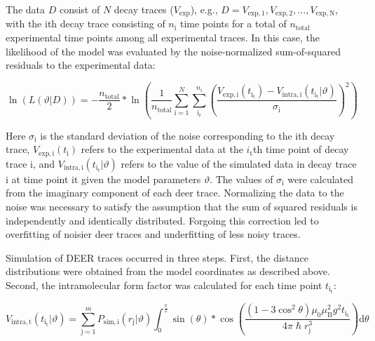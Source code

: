 The data $D$ consist of $N$ decay traces ($V_{\mathup{exp}}$), e.g., $D = {V_{\mathup{exp,1}}, V_{\mathup{exp,2}},…, V_{\mathup{exp,N}}}$, with the $\mathup{i}$th decay trace consisting of $n_{\mathup{i}}$ time points for a total of $n_{\mathup{total}}$ experimental time points among all experimental traces. In this case, the likelihood of the model was evaluated by the noise-normalized sum-of-squared residuals to the experimental data:

\begin{equation}
    \ln \left( L \left( \vartheta | D \right) \right)=-\frac{ n_{\mathup{total}}}{2} * \ln \left( \frac{1} {n_{\mathup{total}}} \sum_{\mathup{i}=1}^{N} \sum_{\mathup{i}_{t}}^{n_{\mathup{i}}} \left( \frac{ V_{\mathup{exp,i}} \left( t_{\mathup{i_t}} \right) - V_{\mathup{intra,i}} \left( t_{\mathup{i_{t}}} | \vartheta \right) }{\sigma_{\mathup{i}}} \right)^2 \right)
    \label{eq:multilateration_loglikelihood}
\end{equation}

Here $\sigma_{\mathup{i}}$ is the standard deviation of the noise corresponding to the $\mathup{i}$th decay trace, $V_{\mathup{exp,i}}\left(t_{\mathup{i}} \right)$ refers to the experimental data at the $i_{\mathup{t}}$th time point of decay trace $\mathup{i}$, and $V_{\mathup{intra,i}}\left( t_{\mathup{i}_{t}}|\vartheta \right)$ refers to the value of the simulated data in decay trace $\mathup{i}$ at time point it given the model parameters $\vartheta$. The values of $\sigma_{\mathup{i}}$ were calculated from the imaginary component of each \gls{deer} trace. Normalizing the data to the noise was necessary to satisfy the assumption that the sum of squared residuals is independently and identically distributed. Forgoing this correction led to overfitting of noisier \gls{deer} traces and underfitting of less noisy traces.

Simulation of DEER traces occurred in three steps. First, the distance distributions were obtained from the model coordinates as described above. Second, the intramolecular form factor was calculated for each time point $t_{\mathup{i_t}}$:

\begin{equation}
    V_{\mathup{intra,t}}\left( t_{\mathup{i_{t}}} | \vartheta \right) = \sum_{\mathup{j}=1}^{m} P_{\mathup{sim,i}} \left( r_{\mathup{j}} | \vartheta \right) \int_{0}^{\frac{\pi}{2}} \sin \left( \theta \right) * \cos \left( \frac{ \left( 1 - 3 \cos^{2} \theta \right) \mu_{0} \mu_{\mathup{B}}^2 g^2 t_{\mathup{i_{t}}} }{4 \pi \hslash r_{\mathup{j}}^{3}} \right) \mathup{d} \theta
    \label{eq:multilateration_kernel}
\end{equation}

